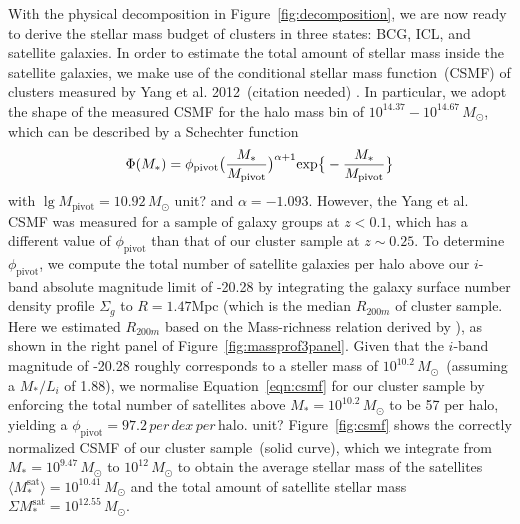 \documentclass[fleqn,usenatbib]{mnras}
\newcommand{\mpc}{\mathrm{Mpc}}
\newcommand{\msol}{M_{\odot}}
\newcommand\ying[1]{{\color{red} {#1}}}
\newcommand\xkchen[1]{{\color{cyan} {#1}}}
\newcommand*\citeme{{\color{green}(citation needed)}}
\begin{document}
With the physical decomposition in Figure~\ref{fig:decomposition}, we are
now ready to derive the stellar mass budget of clusters in three states:
BCG, ICL, and satellite galaxies. In order to estimate the total amount of
stellar mass inside the satellite galaxies, we make use of the conditional
stellar mass function~(CSMF) of clusters measured by Yang et al.
2012~\citeme \xkchen{\citep{Yang2012} }.  In particular, we adopt the shape of the measured CSMF for
the halo mass bin of \xkchen{$10^{14.37}{-}10^{14.67}\,M_{\odot}$}, which can be
described by a Schechter function
\begin{equation}
  \Phi(M_{\ast}) = \phi_{ \mathrm{pivot} } \big{(} \frac{ M_{\ast} }{ M_{
      \mathrm{pivot} } } \big{)}^{\alpha+1} \mathrm{exp} \big{ \{ } -
  \frac{M_{\ast}}{M_{ \mathrm{pivot} } } \big{ \} }
    \label{eqn:csmf}
\end{equation}
with \xkchen{ $\lg M_{\mathrm{pivot}}{=}10.92\,\msol$} \ying{unit?} and $\alpha{=}-1.093$.
However, the Yang et al. CSMF was measured for a sample of galaxy groups at
$z{<}0.1$, which has a different value of $\phi_{\mathrm{pivot}}$ than that
of our cluster sample at $z{\sim}0.25$. To determine
$\phi_{\mathrm{pivot}}$, we compute the total number of satellite galaxies
per halo above our $i$-band absolute magnitude limit of \xkchen{-20.28} by integrating
the galaxy surface number density profile $\Sigma_g$ to \xkchen{$R{=}1.47\mpc$} \xkchen{(which is the median $R_{200m}$ of cluster sample. Here we estimated $R_{200m}$ based on the Mass-richness relation derived by \citep{Simet2017})}, as
shown in the right panel of Figure~\ref{fig:massprof3panel}. Given that the
$i$-band magnitude of \xkchen{-20.28} roughly corresponds to a steller mass of
\xkchen{$10^{10.2}\,\msol$}~(assuming a $M_*/L_i$ of \xkchen{1.88}), we normalise Equation~\ref{eqn:csmf}
for our cluster sample by enforcing the total number of satellites above
\xkchen{$M_*=10^{10.2}\,\msol$} to be \xkchen{57} per halo, yielding a
\xkchen{$\phi_{\mathrm{pivot}}{=}97.2\,per\,dex\,per\,\mathrm{halo}$}.\ying{unit?} Figure~\ref{fig:csmf} shows
the correctly normalized CSMF of our cluster sample~(solid curve), which we
integrate from \xkchen{$M_*{=}10^{9.47}\,\msol$} to \xkchen{$10^{12}\,\msol$} to obtain the average stellar mass of
the satellites \xkchen{$\langle{M_*^{\mathrm{sat}}}\rangle{=}10^{10.41}\,\msol$} and the total
amount of satellite stellar mass \xkchen{$\Sigma M_*^{\mathrm{sat}}{=}10^{12.55}\,\msol$}.
\end{document}
